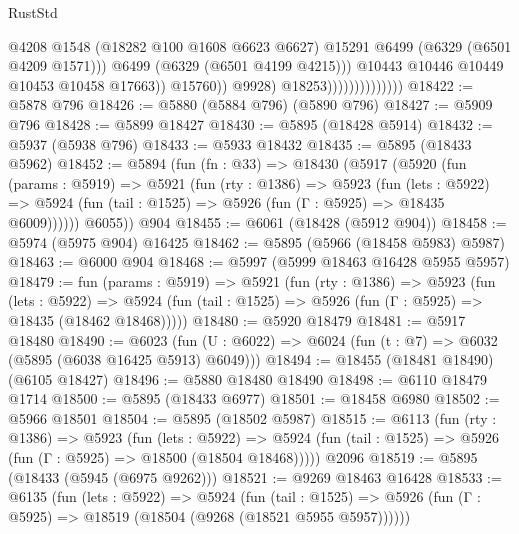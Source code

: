 \begin{lexlean}{RustStd}
\begin{coremodule}
{{                                              @4208
                                              @1548
                                              (@18282 @100 @1608 @6623 @6627)
                                              @15291
                                              @6499
                                              (@6329 (@6501 @4209 @1571)))
                                            @6499
                                            (@6329 (@6501 @4199 @4215)))
                                          @10443
                                          @10446
                                          @10449
                                          @10453
                                          @10458
                                          @17663))
                                      @15760))
                                  @9928)
                                @18253))))))))))))))
@18422 := @5878 @796
@18426 := @5880 (@5884 @796) (@5890 @796)
@18427 := @5909 @796
@18428 := @5899 @18427
@18430 := @5895 (@18428 @5914)
@18432 := @5937 (@5938 @796)
@18433 := @5933 @18432
@18435 := @5895 (@18433 @5962)
@18452 := @5894
    (fun (fn : @33) =>
    @18430
      (@5917
        (@5920
          (fun (params : @5919) =>
          @5921
            (fun (rty : @1386) =>
            @5923
              (fun (lets : @5922) =>
              @5924 (fun (tail : @1525) => @5926 (fun (Γ : @5925) => @18435 @6009))))))
        @6055))
    @904
@18455 := @6061 (@18428 (@5912 @904))
@18458 := @5974 (@5975 @904) @16425
@18462 := @5895 (@5966 (@18458 @5983) @5987)
@18463 := @6000 @904
@18468 := @5997 (@5999 @18463 @16428 @5955 @5957)
@18479 := fun (params : @5919) =>
  @5921
    (fun (rty : @1386) =>
    @5923
      (fun (lets : @5922) =>
      @5924 (fun (tail : @1525) => @5926 (fun (Γ : @5925) => @18435 (@18462 @18468)))))
@18480 := @5920 @18479
@18481 := @5917 @18480
@18490 := @6023
    (fun (U : @6022) => @6024 (fun (t : @7) => @6032 (@5895 (@6038 @16425 @5913) @6049)))
@18494 := @18455 (@18481 @18490) (@6105 @18427)
@18496 := @5880 @18480 @18490
@18498 := @6110 @18479 @1714
@18500 := @5895 (@18433 @6977)
@18501 := @18458 @6980
@18502 := @5966 @18501
@18504 := @5895 (@18502 @5987)
@18515 := @6113
    (fun (rty : @1386) =>
    @5923
      (fun (lets : @5922) =>
      @5924 (fun (tail : @1525) => @5926 (fun (Γ : @5925) => @18500 (@18504 @18468)))))
    @2096
@18519 := @5895 (@18433 (@5945 (@6975 @9262)))
@18521 := @9269 @18463 @16428
@18533 := @6135
    (fun (lets : @5922) =>
    @5924
      (fun (tail : @1525) =>
      @5926 (fun (Γ : @5925) => @18519 (@18504 (@9268 (@18521 @5955 @5957))))))
}}
\end{coremodule}
\end{lexlean}
